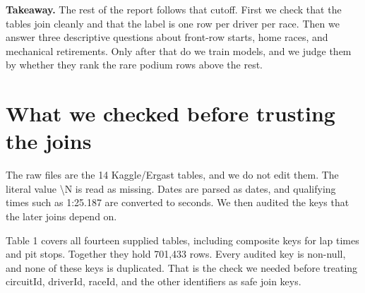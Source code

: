 \documentclass[10pt,a4paper]{article}
\begin{document}
\begin{takeaway}
\textbf{Takeaway.} The rest of the report follows that cutoff. First we check that the tables join cleanly and that the label is one row per driver per race. Then we answer three descriptive questions about front-row starts, home races, and mechanical retirements. Only after that do we train models, and we judge them by whether they rank the rare podium rows above the rest.
\end{takeaway}



\section{What we checked before trusting the joins}


The raw files are the 14 Kaggle/Ergast tables, and we do not edit them. The literal value \textbackslash{}N is read as missing. Dates are parsed as dates, and qualifying times such as 1:25.187 are converted to seconds. We then audited the keys that the later joins depend on.


Table 1 covers all fourteen supplied tables, including composite keys for lap times and pit stops. Together they hold 701,433 rows. Every audited key is non-null, and none of these keys is duplicated. That is the check we needed before treating circuitId, driverId, raceId, and the other identifiers as safe join keys.
\end{document}
